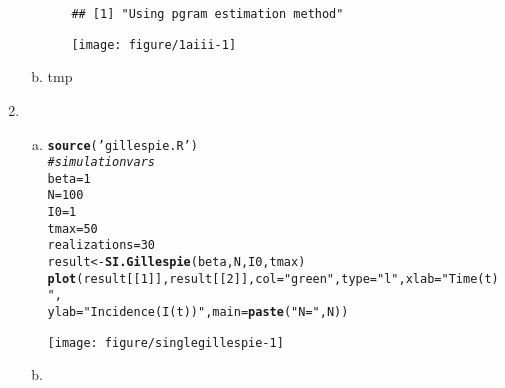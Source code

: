 \documentclass[12pt]{article}\usepackage[]{graphicx}\usepackage[]{color}
\makeatletter
\def\maxwidth{ %
  \ifdim\Gin@nat@width>\linewidth
    \linewidth
  \else
    \Gin@nat@width
  \fi
}
\newcommand{\hlnum}[1]{\textcolor[rgb]{0.686,0.059,0.569}{#1}}%
\newcommand{\hlstr}[1]{\textcolor[rgb]{0.192,0.494,0.8}{#1}}%
\newcommand{\hlcom}[1]{\textcolor[rgb]{0.678,0.584,0.686}{\textit{#1}}}%
\newcommand{\hlstd}[1]{\textcolor[rgb]{0.345,0.345,0.345}{#1}}%
\newcommand{\hlkwb}[1]{\textcolor[rgb]{0.69,0.353,0.396}{#1}}%
\newcommand{\hlkwc}[1]{\textcolor[rgb]{0.333,0.667,0.333}{#1}}%
\newcommand{\hlkwd}[1]{\textcolor[rgb]{0.737,0.353,0.396}{\textbf{#1}}}%
\newenvironment{kframe}{%
 \def\at@end@of@kframe{}%
 \ifinner\ifhmode%
  \def\at@end@of@kframe{\end{minipage}}%
  \begin{minipage}{\columnwidth}%
 \fi\fi%
 \def\FrameCommand##1{\hskip\@totalleftmargin \hskip-\fboxsep
 \colorbox{shadecolor}{##1}\hskip-\fboxsep
     \hskip-\linewidth \hskip-\@totalleftmargin \hskip\columnwidth}%
 \MakeFramed {\advance\hsize-\width
   \@totalleftmargin\z@ \linewidth\hsize
   \@setminipage}}%
 {\par\unskip\endMakeFramed%
 \at@end@of@kframe}
\newenvironment{knitrout}{}{} %
\makeatother
\begin{document}
\begin{enumerate}
\begin{enumerate}[(a)]
\begin{enumerate}[(i)]
\begin{knitrout}
\color{fgcolor}\begin{kframe}
\begin{verbatim}
## [1] "Using pgram estimation method"
\end{verbatim}
\end{kframe}
\texttt{[image: figure/1aiii-1]} 

\end{knitrout}


        \end{enumerate}
        \item \TSb


tmp
    \end{enumerate}
    \item \SEintro
    \begin{enumerate}[(a)]
        \item

\begin{knitrout}
\color{fgcolor}\begin{kframe}
\begin{alltt}
\hlkwd{source}\hlstd{(}\hlstr{'gillespie.R'}\hlstd{)}
\hlcom{#simulation vars}
\hlstd{beta} \hlkwb{=} \hlnum{1}
\hlstd{N} \hlkwb{=} \hlnum{100}
\hlstd{I0} \hlkwb{=} \hlnum{1}
\hlstd{tmax} \hlkwb{=} \hlnum{50}
\hlstd{realizations} \hlkwb{=} \hlnum{30}
\hlstd{result} \hlkwb{<-} \hlkwd{SI.Gillespie}\hlstd{(beta,N,I0,tmax)}
\hlkwd{plot}\hlstd{(result[[}\hlnum{1}\hlstd{]], result[[}\hlnum{2}\hlstd{]],} \hlkwc{col}\hlstd{=}\hlstr{"green"}\hlstd{,} \hlkwc{type}\hlstd{=}\hlstr{"l"}\hlstd{,} \hlkwc{xlab}\hlstd{=}\hlstr{"Time (t)"}\hlstd{,}
     \hlkwc{ylab}\hlstd{=}\hlstr{"Incidence (I(t))"}\hlstd{,} \hlkwc{main}\hlstd{=}\hlkwd{paste}\hlstd{(}\hlstr{"N ="}\hlstd{,N))}
\end{alltt}
\end{kframe}
\texttt{[image: figure/singlegillespie-1]} 

\end{knitrout}
        \item


\end{enumerate}
\end{enumerate}
\end{document}
